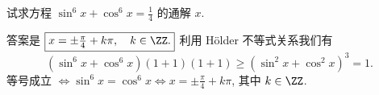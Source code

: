 \begin{prob}
\label{prob:prob-2}
试求方程 $\sin^6 x + \cos^6 x = \frac{1}{4}$ 的通解 $x$.
\end{prob}

\begin{soln}
答案是 $\boxed{x = \pm\tfrac{\pi}{4} + k\pi, \quad k \in \ZZ.}$
利用 H\"{o}lder 不等式关系我们有
\[
(\sin^6 x + \cos^6 x)(1 + 1)(1 + 1) \ge (\sin^2 x + \cos^2 x)^3 = 1.
\]
等号成立 $\iff \sin^6 x = \cos ^6 x \iff x
= \pm\frac{\pi}{4} + k\pi$, 其中 $k \in \ZZ$.
\end{soln}
